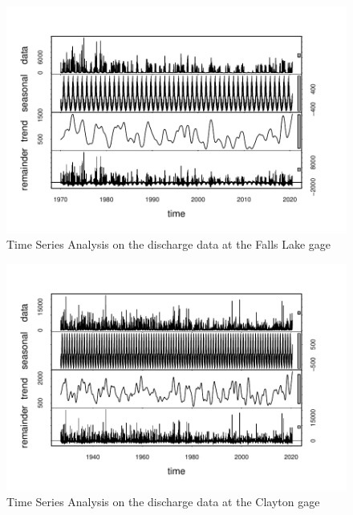 \documentclass[
  12pt,
]{article}
\begin{document}
\begin{figure}

\includegraphics{Gardner_Zeng_ENV872_Project_files/figure-latex/Time series Falls Lake-1} \hfill{}

\caption{Time Series Analysis on the discharge data at the Falls Lake gage}\label{fig:Time series Falls Lake}
\end{figure}

\begin{figure}

\includegraphics{Gardner_Zeng_ENV872_Project_files/figure-latex/Time series Clayton-1} \hfill{}

\caption{Time Series Analysis on the discharge data at the Clayton gage}\label{fig:Time series Clayton}
\end{figure}
\end{document}
